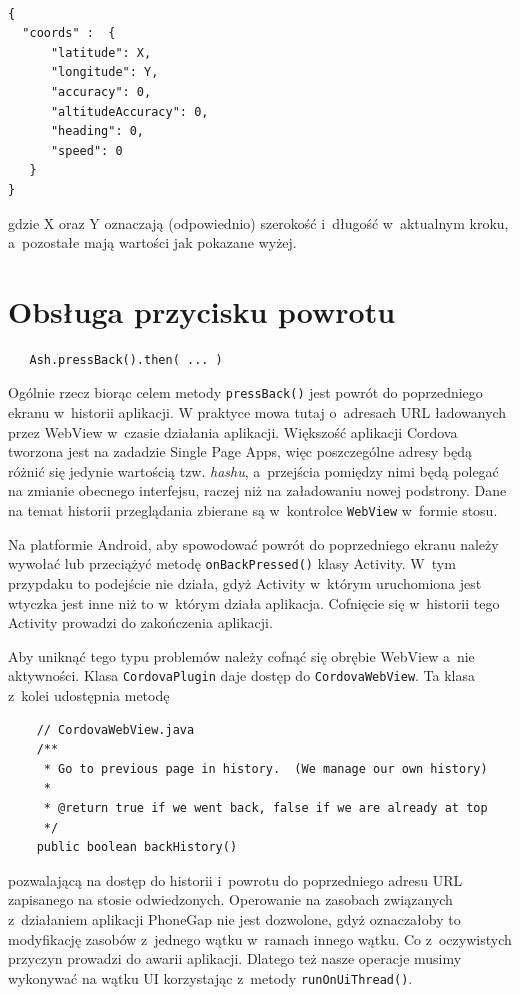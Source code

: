 \documentclass[brudnopis]{xmgr}
\begin{document}
\begin{lstlisting}

{
  "coords" :  {
      "latitude": X, 
      "longitude": Y,
      "accuracy": 0, 
      "altitudeAccuracy": 0, 
      "heading": 0, 
      "speed": 0
   }
}

\end{lstlisting}

gdzie X oraz Y oznaczają (odpowiednio) szerokość i~długość w~aktualnym kroku, a~pozostałe mają wartości jak pokazane wyżej.   

\section{Obsługa przycisku powrotu}

\begin{lstlisting}
   Ash.pressBack().then( ... ) 
\end{lstlisting}

Ogólnie rzecz biorąc celem metody \texttt{pressBack()} jest powrót do poprzedniego ekranu w~historii aplikacji. W praktyce mowa tutaj o~adresach URL ładowanych przez WebView w~czasie działania aplikacji. Większość aplikacji Cordova tworzona jest na zadadzie Single Page Apps, więc poszczególne adresy będą różnić się jedynie wartością tzw. \textit{hashu}, a~przejścia pomiędzy nimi będą polegać na zmianie obecnego interfejsu, raczej niż na załadowaniu nowej podstrony. Dane na temat historii przeglądania zbierane są w~kontrolce \texttt{WebView} w~formie stosu.

Na platformie Android, aby spowodować powrót do poprzedniego ekranu należy wywołać lub przeciążyć metodę \texttt{onBackPressed()} klasy Activity. W~tym przypdaku to podejście nie działa, gdyż Activity w~którym uruchomiona jest wtyczka jest inne niż to w~którym działa aplikacja. Cofnięcie się w~historii tego Activity prowadzi do zakończenia aplikacji. 

Aby uniknąć tego typu problemów należy cofnąć się obrębie WebView a~nie aktywności. Klasa \texttt{CordovaPlugin} daje dostęp do \texttt{CordovaWebView}. Ta klasa z~kolei udostępnia metodę 

\begin{lstlisting}
    // CordovaWebView.java
    /**
     * Go to previous page in history.  (We manage our own history)
     *
     * @return true if we went back, false if we are already at top
     */
    public boolean backHistory()
\end{lstlisting}

pozwalającą na dostęp do historii i~powrotu do poprzedniego  adresu URL zapisanego na stosie odwiedzonych. Operowanie na zasobach związanych z~działaniem aplikacji PhoneGap nie jest dozwolone, gdyż oznaczałoby to modyfikację zasobów z~jednego wątku w~ramach innego wątku. Co z~oczywistych przyczyn prowadzi do awarii aplikacji. Dlatego też nasze operacje musimy wykonywać na wątku UI korzystając z~metody \texttt{runOnUiThread()}.
\end{document}
